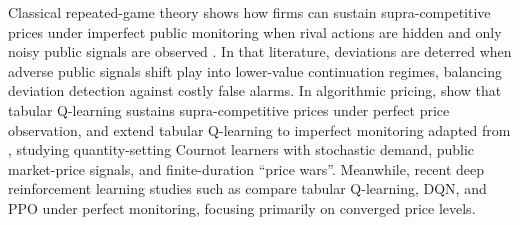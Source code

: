 \documentclass{article}
\begin{document}
Classical repeated-game theory shows how firms can sustain supra-competitive prices under imperfect public monitoring when rival actions are hidden and only noisy public signals are observed \citep{green1984noncooperative, abreu1990toward, fudenberg1994folk}. In that literature, deviations are deterred when adverse public signals shift play into lower-value continuation regimes, balancing deviation detection against costly false alarms. In algorithmic pricing, \citet{calvano2020artificial} show that tabular Q-learning sustains supra-competitive prices under perfect price observation, and \citet{calvano2021algorithmic} extend tabular Q-learning to imperfect monitoring adapted from \citet{green1984noncooperative}, studying quantity-setting Cournot learners with stochastic demand, public market-price signals, and finite-duration ``price wars''. Meanwhile, recent deep reinforcement learning studies such as \citet{deng2025exploring} compare tabular Q-learning, DQN, and PPO under perfect monitoring, focusing primarily on converged price levels.
\end{document}

